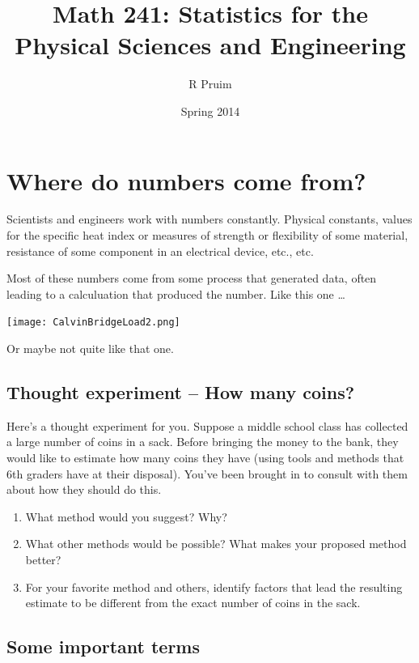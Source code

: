 \documentclass[twoside]{book}\usepackage[]{graphicx}\usepackage[]{xcolor}
\title{Math 241: Statistics for the Physical Sciences and Engineering}
\author{R Pruim}
\date{Spring 2014}
\def\Chapter#1{%
\chapter{#1}
}
\begin{document}
\maketitle
\setcounter{tocdepth}{1}
\tableofcontents







\setcounter{chapter}{-1}
\Chapter{Where do numbers come from?}

Scientists and engineers work with numbers constantly.  Physical constants, values for 
the specific heat index or measures of strength or flexibility of some material, 
resistance of some component in an electrical device, etc., etc.

Most of these numbers come from some process that generated data, often leading to a calculuation
that produced the number.  
Like this one \dots
\begin{center}
\texttt{[image: CalvinBridgeLoad2.png]}
\end{center}

\noindent Or maybe not quite like that one.

\section*{Thought experiment -- How many coins?}
Here's a thought experiment for you.  Suppose a middle school class has collected a 
large number of coins in a sack.  Before bringing the money to the bank, they would like
to estimate how many coins they have (using tools and methods that 6th graders have at
their disposal).  You've been brought in to consult with them about how they should do this.
\begin{enumerate}
	\item
What method would you suggest?  Why?
\item
What other methods would be possible?  What makes your proposed method better?
\item
For your favorite method and others, identify factors that lead the resulting estimate
to be different from the exact number of coins in the sack.  
\end{enumerate}


\section*{Some important terms}
\end{document}
